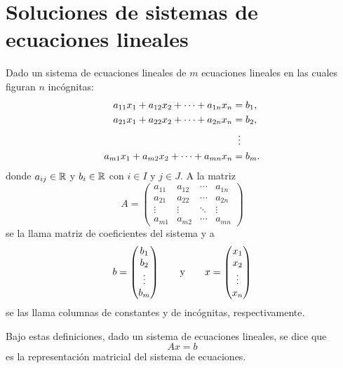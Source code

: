 \documentclass[a4,11pt]{aleph-notas}
\begin{document}
\encabezado

\section{Soluciones de sistemas de ecuaciones lineales}
\begin{defi}
    Dado un sistema de ecuaciones lineales de $m$ ecuaciones lineales en las cuales figuran $n$ incógnitas:
    \begin{align*}
        a_{11}x_1 + a_{12}x_2 + \cdots + a_{1n}x_n &= b_1,\\
        a_{21}x_1 + a_{22}x_2 + \cdots + a_{2n}x_n &= b_2,\\
            & \hspace{2mm} \vdots\\
        a_{m1}x_1 + a_{m2}x_2 + \cdots + a_{mn}x_n &= b_m.
    \end{align*}
    donde $a_{ij}\in\mathbb{R}$ y $b_i\in \mathbb{R}$ con $i\in I$ y $j\in J$. A la matriz
    \[
        A=\begin{pmatrix}
        a_{11} & a_{12} & \cdots & a_{1n}\\
        a_{21} & a_{22} & \cdots & a_{2n}\\
        \vdots & \vdots & \ddots & \vdots\\
        a_{m1} & a_{m2} & \cdots & a_{mn}
        \end{pmatrix}
    \]
    se la llama matriz de coeficientes del sistema y a 
    \[
        b=\begin{pmatrix}
        b_1 \\ b_2 \\ \vdots \\ b_m
        \end{pmatrix}
        \qquad\text{y}\qquad
        x=\begin{pmatrix}
        x_1 \\ x_2 \\ \vdots \\ x_n
        \end{pmatrix}
    \]
    se las llama columnas de constantes y de incógnitas, respectivamente.
\end{defi}

\begin{advertencia}
    Bajo estas definiciones, dado un sistema de ecuaciones lineales, se dice que
    \[
        Ax=b
    \]
    es la representación matricial del sistema de ecuaciones.
\end{advertencia}
\end{document}
